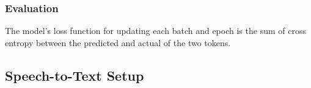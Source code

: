 \subsubsection{Evaluation}

The model's loss function for updating each batch and epoch is the sum of cross entropy between the predicted and actual of the two tokens. 


\subsection{Speech-to-Text Setup}


